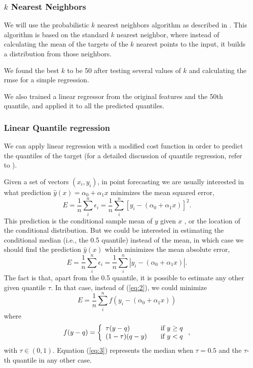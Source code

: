 \documentclass[a4paper,twocolumn,5p]{elsarticle}
\begin{document}
\subsubsection{$k$ Nearest Neighbors}

We will use the probabilistic $k$ nearest neighbors algorithm as described in  
\cite{quantileknnmangalova}. 
This algorithm is based on the standard $k$ nearest neighbor, 
where instead of calculating the mean of 
the targets of the
$k$ nearest points to the input, it builds a distribution 
from those neighbors.

We found the best $k$ to be 50 after testing several values of $k$ and calculating 
the rmse for a simple regression.

We also trained a linear regressor from the original features and the 50th quantile, 
and applied it to all the predicted quantiles. 

\subsubsection{Linear Quantile regression}

We can apply linear regression with a modified cost function in order to 
predict the quantiles of the target (for a detailed discussion of 
quantile regression, refer to \cite{koenker_quantile_2005}). 

Given a 
set of vectors $(x_i, y_i)$, in point forecasting we are usually 
interested in what prediction $\hat y(x) = \alpha_0 + \alpha_1 x$
minimizes the mean squared error,
\begin{equation}
  \label{eq:1}
  E = \frac{1}{n} \sum^n_i \epsilon_i =
  \frac{1}{n} \sum^n_i [ y_i - (\alpha_0 + \alpha_1 x) ]^2.
\end{equation}
This prediction is the conditional sample mean of $y$ given $x$%
, or the location of the conditional distribution. But we could be
interested in estimating the conditional median (i.e., the 0.5
quantile) instead of the mean, in which case we should find the
prediction $\hat y(x)$ which minimizes the mean absolute error,
\begin{equation}
  \label{eq:2}
  E = \frac{1}{n} \sum^n_i \epsilon_i =
  \frac{1}{n} \sum^n_i | y_i - (\alpha_0 + \alpha_1 x) |.
\end{equation}
The fact is that, apart from the 0.5 quantile, it is possible to
estimate any other given quantile $\tau$. In that case, instead of
(\ref{eq:2}), we could minimize
\begin{equation}
  \label{eq:3}
E= \frac{1}{n} \sum^n_i f( y_i - (\alpha_0 + \alpha_1 x))
\end{equation}
where
\begin{equation}
  \label{eq:4}
  f(y-q) = \left\{ 
\begin{array}{l l}
\tau (y-q) & \quad \mbox{if $y \ge q$}\\
(1-\tau) (q-y) & \quad \mbox{if $y < q$}\\
\end{array} \right.,
\end{equation}
with $\tau \in (0,1)$. Equation (\ref{eq:3}) represents the
median when $\tau=0.5$ and the $\tau$-th quantile in any other case.
\end{document}
